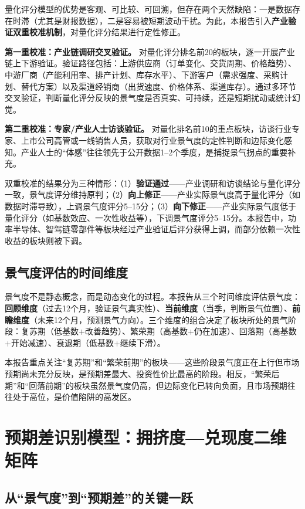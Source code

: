 量化评分模型的优势是客观、可比较、可回溯，但存在两个天然缺陷：一是数据存在时滞（尤其是财报数据），二是容易被短期波动干扰。为此，本报告引入\textbf{产业验证双重校准机制}，对量化评分结果进行定性修正。

\textbf{第一重校准：产业链调研交叉验证。} 对量化评分排名前20的板块，逐一开展产业链上下游验证。验证路径包括：上游供应商（订单变化、交货周期、价格趋势）、中游厂商（产能利用率、排产计划、库存水平）、下游客户（需求强度、采购计划、替代方案）以及渠道经销商（出货速度、价格体系、渠道库存）。通过多环节交叉验证，判断量化评分反映的景气度是否真实、可持续，还是短期扰动或统计幻觉。

\textbf{第二重校准：专家/产业人士访谈验证。} 对量化排名前10的重点板块，访谈行业专家、上市公司高管或一线销售人员，获取对行业景气度的定性判断和边际变化感知。产业人士的“体感”往往领先于公开数据1--2个季度，是捕捉景气拐点的重要补充。

双重校准的结果分为三种情形：（1）\textbf{验证通过}——产业调研和访谈结论与量化评分一致，景气度评分维持原判；（2）\textbf{向上修正}——产业实际景气度高于量化评分（如数据时滞导致），上调景气度评分5--15分；（3）\textbf{向下修正}——产业实际景气度低于量化评分（如基数效应、一次性收益等），下调景气度评分5--15分。本报告中，功率半导体、智驾链零部件等板块经过产业验证后评分获得上调，而部分依赖一次性收益的板块则被下调。

\subsection{景气度评估的时间维度}

景气度不是静态概念，而是动态变化的过程。本报告从三个时间维度评估景气度：\textbf{回顾维度}（过去12个月，验证景气真实性）、\textbf{当前维度}（当季，判断景气位置）、\textbf{前瞻维度}（未来12个月，预测景气方向）。三个维度的组合决定了板块所处的景气阶段：复苏期（低基数+改善趋势）、繁荣期（高基数+仍在加速）、回落期（高基数+开始减速）、衰退期（低基数+继续下滑）。

本报告重点关注“复苏期”和“繁荣前期”的板块——这些阶段景气度正在上行但市场预期尚未充分反映，是预期差最大、投资性价比最高的阶段。相反，“繁荣后期”和“回落前期”的板块虽然景气度仍高，但边际变化已转向负面，且市场预期往往处于高位，是价值陷阱的高发区。

\section{预期差识别模型：拥挤度—兑现度二维矩阵}

\subsection{从“景气度”到“预期差”的关键一跃}

